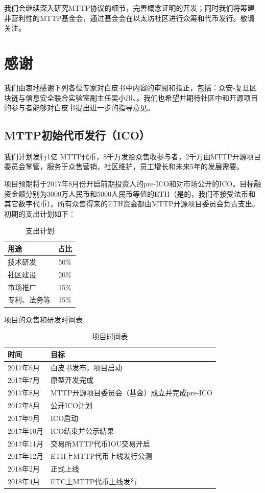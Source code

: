\documentclass[UTF8,nofonts]{ctexart}
\begin{document}
我们会继续深入研究MTTP协议的细节，完善概念证明的开发；同时我们将筹建非营利性的MTTP基金会，通过基金会在以太坊社区进行众筹和代币发行。敬请关注。

\section{感谢\label{sec:acknowledgement}}

我们由衷地感谢下列各位专家对白皮书中内容的审阅和指正，包括：众安-复旦区块链与信息安全联合实验室副主任吴小川、。我们也希望并期待社区中和开源项目的参与者能够对白皮书提出进一步的指导意见。

\newpage



\newpage
\begin{appendices}
\section{MTTP初始代币发行（ICO）\label{sec:ico}}

我们计划发行1亿 MTTP代币，8千万发给众售收参与者，2千万由MTTP开源项目委员会掌管，服务于众售营销，社区维护，员工增长和未来5年的发展需要。

项目预期将于2017年8月份开启前期投资人的pre-ICO和对市场公开的ICO。目标融资金额分别为3000万人民币和5000人民币等值的ETH（是的，我们不接受法币和其它数字代币）。所有众售得来的ETH资金都由MTTP开源项目委员会负责支出。初期的支出计划如下：

\begin{table}[hbt]
  \centering
  \begin{tabular}{l|c}
 用途   & 占比\\
    \hline
  技术研发 & 50\% \\
  社区建设 & 20\% \\
  市场推广 & 15\% \\
  专利、法务等 & 15\% \\
  \end{tabular}
  \caption{支出计划}
\end{table}


项目的众售和研发时间表
\begin{table}[hbt]
  \centering
  \begin{tabular}{l|l}
 时间   & 目标\\
    \hline
  2017年6月 & 白皮书发布，项目启动 \\
  2017年7月 & 原型开发完成 \\
  2017年8月 & MTTP开源项目委员会（基金）成立并完成pre-ICO \\
  2017年8月 & 公开ICO计划 \\
  2017年9月 & ICO启动 \\
  2017年10月 & ICO结束并公示结果 \\
  2017年11月 & 交易所MTTP代币IOU交易开启 \\
  2017年12月 & ETH上MTTP代币上线发行公测 \\
  2018年2月 & 正式上线 \\
  2018年4月 & ETC上MTTP代币上线发行 \\
  \end{tabular}
  \caption{项目时间表}
\end{table}


\end{appendices}
\end{document}
